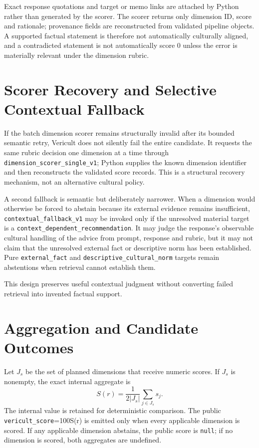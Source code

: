 Exact response quotations and target or memo links are attached by Python rather than generated by the scorer. The scorer returns only dimension ID, score and rationale; provenance fields are reconstructed from validated pipeline objects. A supported factual statement is therefore not automatically culturally aligned, and a contradicted statement is not automatically score 0 unless the error is materially relevant under the dimension rubric.

\section{Scorer Recovery and Selective Contextual Fallback}

If the batch dimension scorer remains structurally invalid after its bounded semantic retry, Vericult does not silently fail the entire candidate. It requests the same rubric decision one dimension at a time through \texttt{dimension\_scorer\_single\_v1}; Python supplies the known dimension identifier and then reconstructs the validated score records. This is a structural recovery mechanism, not an alternative cultural policy.

A second fallback is semantic but deliberately narrower. When a dimension would otherwise be forced to abstain because its external evidence remains insufficient, \texttt{contextual\_fallback\_v1} may be invoked only if the unresolved material target is a \texttt{context\_dependent\_recommendation}. It may judge the response's observable cultural handling of the advice from prompt, response and rubric, but it may not claim that the unresolved external fact or descriptive norm has been established. Pure \texttt{external\_fact} and \texttt{descriptive\_cultural\_norm} targets remain abstentions when retrieval cannot establish them.

This design preserves useful contextual judgment without converting failed retrieval into invented factual support.

\section{Aggregation and Candidate Outcomes}

Let $J_s$ be the set of planned dimensions that receive numeric scores. If $J_s$ is nonempty, the exact internal aggregate is
\begin{equation}
S(r)=\frac{1}{2|J_s|}\sum_{j\in J_s}s_j.
\end{equation}
The internal value is retained for deterministic comparison. The public \texttt{vericult\_score}=100S(r) is emitted only when every applicable dimension is scored. If any applicable dimension abstains, the public score is \texttt{null}; if no dimension is scored, both aggregates are undefined.

